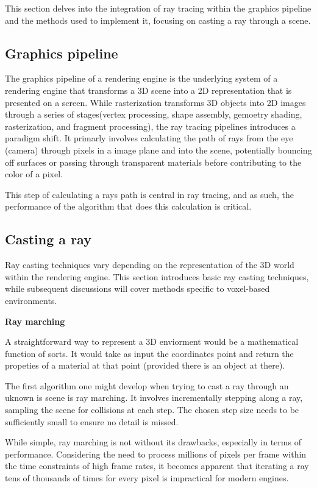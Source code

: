 This section delves into the integration of ray tracing within the graphics pipeline and the methods used to implement it, focusing on casting a ray through a scene.

\subsection{Graphics pipeline}
The graphics pipeline of a rendering engine is the underlying system of a rendering engine that transforms a 3D scene into a 2D representation that is presented on a screen. While rasterization transforms 3D objects into 2D images through a series of stages(vertex processing, shape assembly, gemoetry shading, rasterization, and fragment processing), the ray tracing pipelines introduces a paradigm shift. It primarly involves calculating the path of rays from the eye (camera) through pixels in a image plane and into the scene, potentially bouncing off surfaces or passing through transparent materials before contributing to the color of a pixel.

This step of calculating a rays path is central in ray tracing, and as such, the performance of the algorithm that does this calculation is critical.
\subsection{Casting a ray}
Ray casting techniques vary depending on the representation of the 3D world within the rendering engine.
This section introduces basic ray casting techniques, while subsequent discussions will cover methods specific to voxel-based environments.

\vspace{0.5cm}
\textbf{Ray marching}

A straightforward way to represent a 3D enviorment would be a mathematical function of sorts.
It would take as input the coordinates point and return the propeties of a material at that point (provided there is an object at there).

The first algorithm one might develop when trying to cast a ray through an uknown is scene is ray marching.
It involves incrementally stepping along a ray, sampling the scene for collisions at each step.
The chosen step size needs to be sufficiently small to ensure no detail is missed.

While simple, ray marching is not without its drawbacks, especially in terms of performance.
Considering the need to process millions of pixels per frame within the time constraints of high frame rates, it becomes apparent that iterating a ray tens of thousands of times for every pixel is impractical for modern engines.

